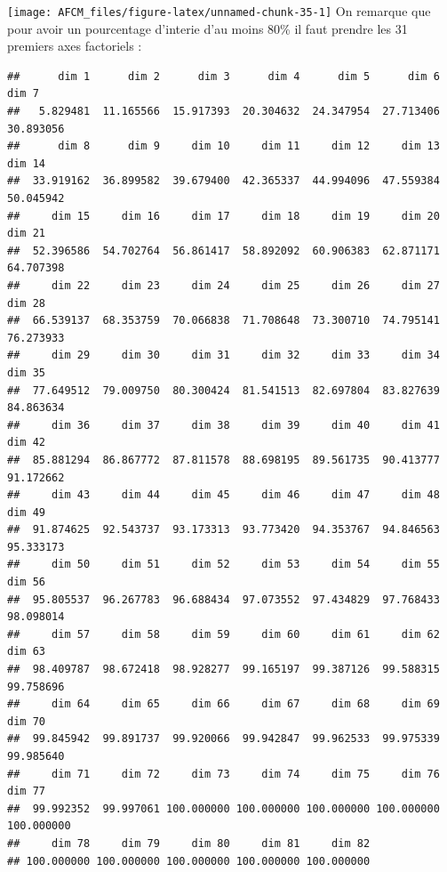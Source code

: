 \documentclass[
]{article}
\newenvironment{Shaded}{\begin{snugshade}}{\end{snugshade}}
\newcommand{\DecValTok}[1]{\textcolor[rgb]{0.00,0.00,0.81}{#1}}
\newcommand{\FunctionTok}[1]{\textcolor[rgb]{0.00,0.00,0.00}{#1}}
\newcommand{\NormalTok}[1]{#1}
\newcommand{\SpecialCharTok}[1]{\textcolor[rgb]{0.00,0.00,0.00}{#1}}
\begin{document}
\begin{Shaded}
\end{Shaded}

\texttt{[image: AFCM\_files/figure-latex/unnamed-chunk-35-1]}
On remarque que pour avoir un pourcentage d'interie d'au moins 80\% il
faut prendre les 31 premiers axes factoriels :

\begin{Shaded}
\end{Shaded}

\begin{verbatim}
##      dim 1      dim 2      dim 3      dim 4      dim 5      dim 6      dim 7 
##   5.829481  11.165566  15.917393  20.304632  24.347954  27.713406  30.893056 
##      dim 8      dim 9     dim 10     dim 11     dim 12     dim 13     dim 14 
##  33.919162  36.899582  39.679400  42.365337  44.994096  47.559384  50.045942 
##     dim 15     dim 16     dim 17     dim 18     dim 19     dim 20     dim 21 
##  52.396586  54.702764  56.861417  58.892092  60.906383  62.871171  64.707398 
##     dim 22     dim 23     dim 24     dim 25     dim 26     dim 27     dim 28 
##  66.539137  68.353759  70.066838  71.708648  73.300710  74.795141  76.273933 
##     dim 29     dim 30     dim 31     dim 32     dim 33     dim 34     dim 35 
##  77.649512  79.009750  80.300424  81.541513  82.697804  83.827639  84.863634 
##     dim 36     dim 37     dim 38     dim 39     dim 40     dim 41     dim 42 
##  85.881294  86.867772  87.811578  88.698195  89.561735  90.413777  91.172662 
##     dim 43     dim 44     dim 45     dim 46     dim 47     dim 48     dim 49 
##  91.874625  92.543737  93.173313  93.773420  94.353767  94.846563  95.333173 
##     dim 50     dim 51     dim 52     dim 53     dim 54     dim 55     dim 56 
##  95.805537  96.267783  96.688434  97.073552  97.434829  97.768433  98.098014 
##     dim 57     dim 58     dim 59     dim 60     dim 61     dim 62     dim 63 
##  98.409787  98.672418  98.928277  99.165197  99.387126  99.588315  99.758696 
##     dim 64     dim 65     dim 66     dim 67     dim 68     dim 69     dim 70 
##  99.845942  99.891737  99.920066  99.942847  99.962533  99.975339  99.985640 
##     dim 71     dim 72     dim 73     dim 74     dim 75     dim 76     dim 77 
##  99.992352  99.997061 100.000000 100.000000 100.000000 100.000000 100.000000 
##     dim 78     dim 79     dim 80     dim 81     dim 82 
## 100.000000 100.000000 100.000000 100.000000 100.000000
\end{verbatim}
\end{document}

